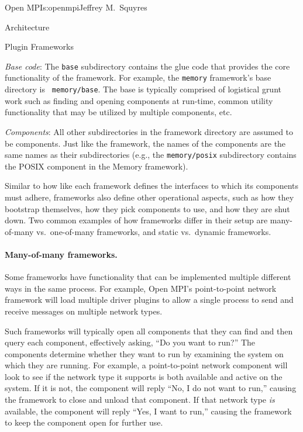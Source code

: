 \begin{aosachapter}{Open MPI}{s:openmpi}{Jeffrey M.\ Squyres}
\begin{aosasect1}{Architecture}
\begin{aosasect2}{Plugin Frameworks}
\begin{aosaenumerate}
\item \emph{Base code}: The {\tt base} subdirectory contains the glue
  code that provides the core functionality of the framework.  For
  example, the {\tt memory} framework's base directory is {\tt
    memory/base}.  The base is typically comprised of logistical grunt
  work such as finding and opening components at run-time, common
  utility functionality that may be utilized by multiple components,
  etc.

\item \emph{Components}: All other subdirectories in the framework
  directory are assumed to be components.  Just like the framework,
  the names of the components are the same names as their
  subdirectories (e.g., the {\tt memory/posix} subdirectory contains
  the POSIX component in the Memory framework).
\end{aosaenumerate}

Similar to how like each framework defines the interfaces to which its
components must adhere, frameworks also define other operational
aspects, such as how they bootstrap themselves, how they pick
components to use, and how they are shut down.  Two common examples of
how frameworks differ in their setup are many-of-many vs.\ one-of-many
frameworks, and static vs.\ dynamic frameworks.


\paragraph{Many-of-many frameworks.} 

Some frameworks have functionality that can be implemented multiple
different ways in the same process.
%
For example, Open MPI's point-to-point network framework will load
multiple driver plugins to allow a single process to send and receive
messages on multiple network types.

Such frameworks will typically open all components that they can find
and then query each component, effectively asking, ``Do you want to
run?''  
%
The components determine whether they want to run by examining the
system on which they are running.
%
For example, a point-to-point network component will look to see if
the network type it supports is both available and active on the
system.
%
If it is not, the component will reply ``No, I do not want to run,''
causing the framework to close and unload that component.
% 
If that network type \emph{is} available, the component will reply
``Yes, I want to run,'' causing the framework to keep the component
open for further use.


\end{aosasect2}
\end{aosasect1}
\end{aosachapter}
